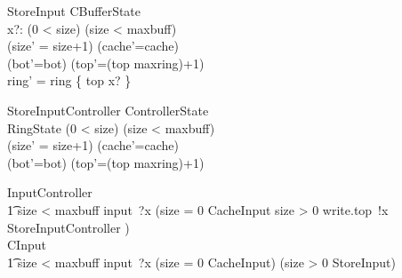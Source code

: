 \documentclass{article}
\begin{document}
\begin{schema}{StoreInput}
    \Delta CBufferState
        \\%
        x?: \nat
\where
        (0 < size) \land (size < maxbuff)
        \\%
        (size' = size+1) \land (cache'=cache)
        \\%
        (bot'=bot) \land (top'=(top \mod maxring)+1)
        \\%
        ring' = ring \oplus \{ top \mapsto x? \}
\end{schema}

\begin{schema}{StoreInputController}
    \Delta ControllerState
        \\%
        \Xi RingState
\where
        (0 < size) \land (size < maxbuff)
        \\%
        (size' = size+1) \land (cache'=cache)
        \\%
        (bot'=bot) \land (top'=(top \mod maxring)+1)
\end{schema}

%
%

\begin{circusaction}
    InputController ~~\circdef~~ \\
        \t1 \lcircguard size < maxbuff \rcircguard \circguard input~?x \then
            (\lcircguard size = 0 \rcircguard \circguard CacheInput
            \extchoice
             \lcircguard size > 0 \rcircguard \circguard write.top~!x \then StoreInputController
            ) \\
    CInput \circdef \\
        \t1 \lcircguard size < maxbuff \rcircguard \circguard input~?x \then
            (\lcircguard size = 0 \rcircguard \circguard CacheInput)
            \extchoice
            (\lcircguard size > 0 \rcircguard \circguard StoreInput)
\end{circusaction}
\end{document}
